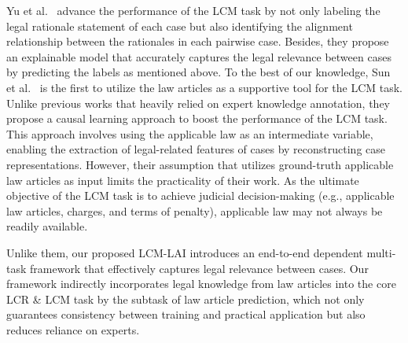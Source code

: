 Yu et al.~\cite{yu2022Explainable} advance the performance of the LCM task by not only labeling the legal rationale statement of each case but also identifying the alignment relationship between the rationales in each pairwise case.
Besides, they propose an explainable model that accurately captures the legal relevance between cases by predicting the labels as mentioned above.
To the best of our knowledge, Sun et al.~\cite{sun2023law} is the first to utilize the law articles as a supportive tool for the LCM task.
Unlike previous works that heavily relied on expert knowledge annotation, they propose a causal learning approach to boost the performance of the LCM task. 
This approach involves using the applicable law as an intermediate variable, enabling the extraction of legal-related features of cases by reconstructing case representations.
However, their assumption that utilizes ground-truth applicable law articles as input limits the practicality of their work. 
As the ultimate objective of the LCM task is to achieve judicial decision-making (e.g., applicable law articles, charges, and terms of penalty), applicable law may not always be readily available.

Unlike them, our proposed LCM-LAI introduces an end-to-end dependent multi-task framework that effectively captures legal relevance between cases.
Our framework indirectly incorporates legal knowledge from law articles into the core LCR \& LCM task by the subtask of law article prediction, which not only guarantees consistency between training and practical application but also reduces reliance on experts.


